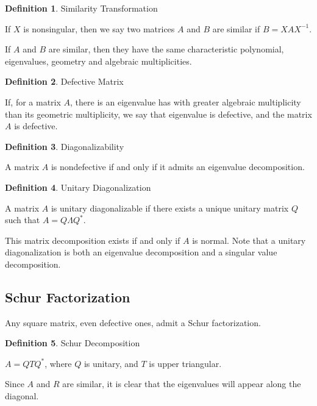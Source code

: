 \documentclass{article}
\theoremstyle{definition}
\newtheorem{definition}{Definition}[section]
\begin{document}
\vspace{3ex}
\begin{definition}{Similarity Transformation}

If $X$ is nonsingular, then we say two matrices $A$ and $B$ are similar if $B = X A X^{-1}$.

If $A$ and $B$ are similar, then they have the same characteristic polynomial, eigenvalues, geometry and algebraic multiplicities.

\end{definition}

\vspace{3ex}
\begin{definition}{Defective Matrix}

If, for a matrix $A$, there is an eigenvalue has with greater algebraic multiplicity than its geometric multiplicity, we say that eigenvalue is defective, and the matrix $A$ is defective.

\end{definition}

\vspace{3ex}
\begin{definition}{Diagonalizability}

A matrix $A$ is nondefective if and only if it admits an eigenvalue decomposition.

\end{definition}

\vspace{3ex}
\begin{definition}{Unitary Diagonalization}

A matrix $A$ is unitary diagonalizable if there exists a unique unitary matrix $Q$ such that $A = Q \Lambda Q^*$.

This matrix decomposition exists if and only if $A$ is normal. Note that a unitary diagonalization is both an eigenvalue decomposition and a singular value decomposition.

\end{definition}

\subsection{Schur Factorization}

Any square matrix, even defective ones, admit a Schur factorization. \newline

\begin{definition}{Schur Decomposition}

$A = Q T Q^*$, where $Q$ is unitary, and $T$ is upper triangular.

Since $A$ and $R$ are similar, it is clear that the eigenvalues will appear along the diagonal.

\end{definition}
\end{document}

